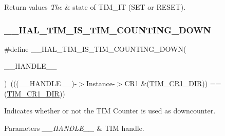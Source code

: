 \begin{DoxyRetVals}{Return values}
{\em The} & state of T\+I\+M\+\_\+\+IT (S\+ET or R\+E\+S\+ET). \\
\hline
\end{DoxyRetVals}
\mbox{\label{group___t_i_m___exported___macros_gac73f5e7669d92971830481e7298e98ba}} 
\subsubsection{\texorpdfstring{\+\_\+\+\_\+\+H\+A\+L\+\_\+\+T\+I\+M\+\_\+\+I\+S\+\_\+\+T\+I\+M\+\_\+\+C\+O\+U\+N\+T\+I\+N\+G\+\_\+\+D\+O\+WN}{\_\_HAL\_TIM\_IS\_TIM\_COUNTING\_DOWN}}
{\footnotesize\ttfamily \#define \+\_\+\+\_\+\+H\+A\+L\+\_\+\+T\+I\+M\+\_\+\+I\+S\+\_\+\+T\+I\+M\+\_\+\+C\+O\+U\+N\+T\+I\+N\+G\+\_\+\+D\+O\+WN(\begin{DoxyParamCaption}\item[{}]{\+\_\+\+\_\+\+H\+A\+N\+D\+L\+E\+\_\+\+\_\+ }\end{DoxyParamCaption})~(((\+\_\+\+\_\+\+H\+A\+N\+D\+L\+E\+\_\+\+\_\+)-\/$>$Instance-\/$>$C\+R1 \&(\mbox{\hyperlink{group___peripheral___registers___bits___definition_gacea10770904af189f3aaeb97b45722aa}{T\+I\+M\+\_\+\+C\+R1\+\_\+\+D\+IR}})) == (\mbox{\hyperlink{group___peripheral___registers___bits___definition_gacea10770904af189f3aaeb97b45722aa}{T\+I\+M\+\_\+\+C\+R1\+\_\+\+D\+IR}}))}



Indicates whether or not the T\+IM Counter is used as downcounter. 


\begin{DoxyParams}{Parameters}
{\em \+\_\+\+\_\+\+H\+A\+N\+D\+L\+E\+\_\+\+\_\+} & T\+IM handle. \\
\hline
\end{DoxyParams}

